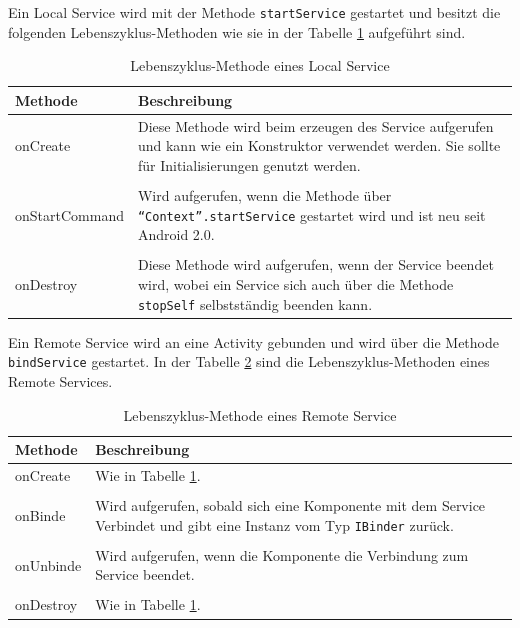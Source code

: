 Ein Local Service wird mit der Methode \texttt{startService} gestartet und besitzt die folgenden Lebenszyklus-Methoden wie sie in der Tabelle \ref{Lebenszyklus-Methode eines Local Service} aufgef\"uhrt sind.

\begin{table}[!ht]
\begin{tabular}{|p{3cm}|p{12cm}|}
 \hline Methode & Beschreibung \\
 \hline onCreate & Diese Methode wird beim erzeugen des Service aufgerufen und kann wie ein Konstruktor verwendet werden. Sie sollte f\"ur Initialisierungen genutzt werden.\\&\\
 onStartCommand & Wird aufgerufen, wenn die Methode \"uber \texttt{"`Context"'.startService} gestartet wird und ist neu seit Android 2.0.\\&\\
 onDestroy & Diese Methode wird aufgerufen, wenn der Service beendet wird, wobei ein Service sich auch \"uber die Methode \texttt{stopSelf} selbstst\"andig beenden kann.\\
 \hline
\end{tabular}
\caption{Lebenszyklus-Methode eines Local Service \cite{Android44}}
\label{Lebenszyklus-Methode eines Local Service}
\end{table}
\FloatBarrier

Ein Remote Service wird an eine Activity gebunden und wird \"uber die Methode \texttt{bindService} gestartet. In der Tabelle \ref{Lebenszyklus-Methode eines Remote Service} sind die Lebenszyklus-Methoden eines Remote Services.

\FloatBarrier
\begin{table}[!ht]
\begin{tabular}{|p{3cm}|p{12cm}|}
 \hline Methode & Beschreibung \\
 \hline onCreate & Wie in Tabelle \ref{Lebenszyklus-Methode eines Local Service}.\\&\\
 onBinde & Wird aufgerufen, sobald sich eine Komponente mit dem Service Verbindet und gibt eine Instanz vom Typ \texttt{IBinder} zur\"uck.\\&\\
 onUnbinde & Wird aufgerufen, wenn die Komponente die Verbindung zum Service beendet.\\&\\
 onDestroy & Wie in Tabelle \ref{Lebenszyklus-Methode eines Local Service}.\\
 \hline
\end{tabular}
\caption{Lebenszyklus-Methode eines Remote Service \cite{Android44}}
\label{Lebenszyklus-Methode eines Remote Service}
\end{table}
\FloatBarrier

